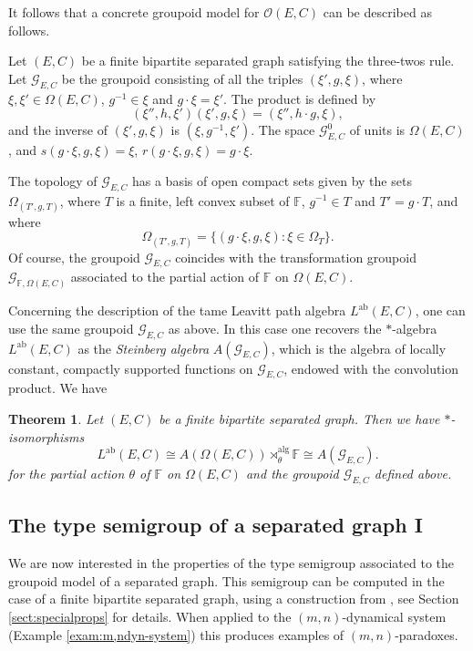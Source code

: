 \documentclass[11pt]{amsart}
\newcommand{\Lab}{L^{{\mathrm{ab}}}}
\newcommand{\alrtimes}{\rtimes^{\mathrm{alg}}}
\theoremstyle{plain}            %
\newtheorem{theorem}{Theorem}[section]
\theoremstyle{definition}       %
\theoremstyle{definition}       %
\theoremstyle{remark}
\newcommand{\F}{\mathbb F}
\begin{document}
It follows that a concrete groupoid model for $\mathcal O (E,C)$ can be described as follows. 

Let $(E,C)$ be a finite bipartite separated graph satisfying the three-twos rule. Let $\mathcal G_{E,C}$ be the groupoid consisting of all the triples $(\xi',g,\xi)$, where $\xi,\xi'\in \Omega (E,C)$, $g^{-1}\in \xi$ and $g\cdot \xi = \xi'$.  The product is defined by
$$(\xi'',h,\xi')(\xi',g,\xi) = (\xi'', h\cdot g, \xi),$$
and the inverse of $(\xi', g,\xi)$ is $(\xi, g^{-1},\xi')$. 
The space $\mathcal G_{E,C}^0$ of units is $\Omega (E,C)$, and $s(g\cdot \xi,g,\xi)= \xi$, $r(g\cdot \xi,g,\xi)= g\cdot \xi$. 

The topology of $\mathcal G_{E,C}$ has a basis of open compact sets given by the sets $\Omega_{(T',g,T)}$, where $T$ is a finite, left convex subset of $\F$, $g^{-1}\in T$ and $T'=g\cdot T$, and where 
$$\Omega_{(T',g,T)} = \{ (g\cdot \xi,g,\xi): \xi \in \Omega_T\}. $$
Of course, the groupoid $\mathcal G _{E,C}$ coincides with the transformation groupoid $\mathcal G_{\F,\Omega(E,C)}$ associated to the partial action of $\F$ on $\Omega (E,C)$. 

Concerning the description of the tame Leavitt path algebra $\Lab (E,C)$, one can use the same groupoid $\mathcal G_{E,C}$ as above. In this case one recovers the $*$-algebra $\Lab (E,C)$ as the {\it Steinberg algebra} $A(\mathcal G _{E,C})$, which is the algebra of locally constant, compactly supported functions on $\mathcal G_{E,C}$, endowed with the convolution product.  We have

\begin{theorem} {\rm{\cite{ae14}}}
	\label{thm:charac-tameLeavitt}
	Let $(E,C)$ be a finite bipartite separated graph. Then we have  $*$-isomorphisms
	$$\Lab  (E,C) \cong A(\Omega (E,C)) \alrtimes _\theta \F \cong A(\mathcal G_{E,C}).$$
	for the partial action $\theta $ of $\F$ on $\Omega(E,C)$ and the groupoid $\mathcal G_{E,C}$ defined above. 
\end{theorem}




\subsection{The type semigroup of a separated graph I}
\label{subsect:type-semigroup}


We are now interested in the properties of the type semigroup associated to the groupoid model of a separated graph. This semigroup can be computed in the case of a finite bipartite separated graph, using a construction from \cite{ae14}, see Section \ref{sect:specialprops} for details. When applied to the $(m,n)$-dynamical system (Example \ref{exam:m,ndyn-system}) this produces examples of $(m,n)$-paradoxes. 
\end{document}
